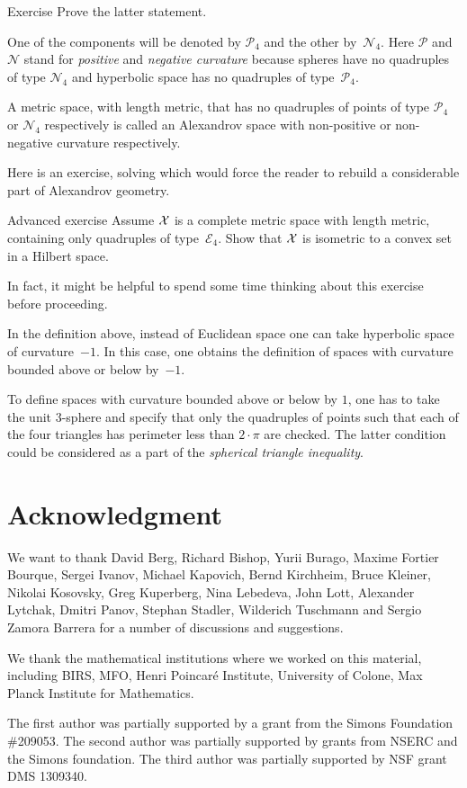\begin{thm}{Exercise}\label{ex:two-components-of-M4}
Prove the latter statement.
\end{thm}


One of the components will be denoted by $\mathcal{P}_4$ and the other by~$\mathcal{N}_4$.
Here $\mathcal{P}$ and $\mathcal{N}$ stand for {}\emph{positive} 
and {}\emph{negative curvature} because spheres have no quadruples of type $\mathcal{N}_4$ and 
hyperbolic space
has no quadruples of type~$\mathcal{P}_4$.

A metric space, with length metric, 
that has no quadruples of points of type $\mathcal{P}_4$ or $\mathcal{N}_4$
respectively 
is called an Alexandrov space with non-positive or non-negative curvature respectively.

Here is an exercise, solving which would force the reader to rebuild a considerable part of Alexandrov geometry.

\begin{thm}{Advanced exercise}\label{ex:convex-set}
Assume $\mathcal{X}$ is a complete metric space with length metric, 
containing only quadruples of type~$\mathcal{E}_4$.
Show that $\mathcal{X}$ is isometric to a convex set in a Hilbert space.
\end{thm}

In fact, it might be helpful to spend some time thinking about this exercise before proceeding.

In the definition above, 
instead of  Euclidean space 
one can take  
hyperbolic space of curvature~$-1$.
In this case,
one obtains the definition of spaces with curvature bounded above or below by~$-1$.

To define spaces with curvature bounded above or below by $1$,
one has to take the unit 3-sphere 
and specify that only the quadruples of points such that each of the four triangles has perimeter 
less than $2\cdot\pi$ are checked.
The latter condition could be considered as a part of the {}\emph{spherical triangle inequality}.


\section*{Acknowledgment}
We want to  thank 
David Berg,
Richard Bishop,
Yurii Burago,
Maxime Fortier Bourque,
Sergei Ivanov,
Michael Kapovich, 
Bernd Kirchheim, 
Bruce Kleiner,
Nikolai Kosovsky,
Greg Kuperberg,
Nina Lebedeva,
John Lott,
Alexander Lytchak,
Dmitri Panov,
Stephan Stadler,
Wilderich Tuschmann
and 
Sergio Zamora Barrera
for a number of discussions and suggestions.

We thank the mathematical institutions where we worked on this material,  including
BIRS, 
MFO, 
Henri Poincar\'{e} Institute,
University of Colone, 
Max Planck Institute for Mathematics. 

The first author was partially supported by a grant from the Simons Foundation \#209053.
The second author was partially supported by grants from NSERC and the Simons foundation.
The third author was partially supported by NSF grant DMS 1309340.

